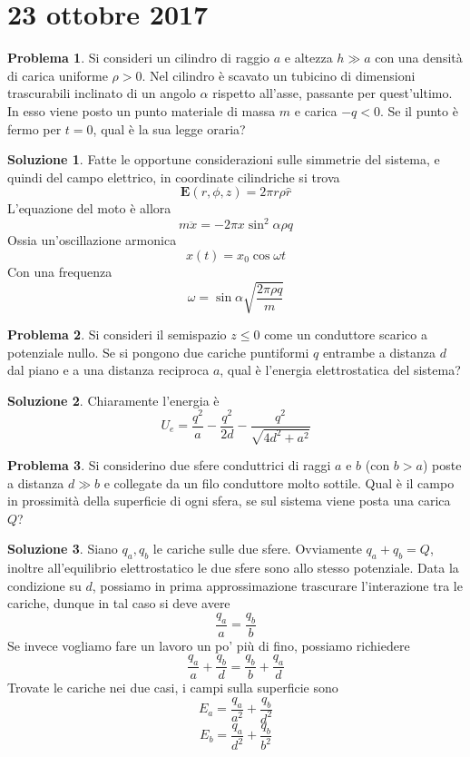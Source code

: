 \documentclass[a4paper,11pt]{book}
\renewcommand{\vec}[1]{\mathbf{#1}}
\theoremstyle{theorem}
\theoremstyle{definition}
\newtheorem{problema}{Problema}[section]
\newtheorem{soluzione}{Soluzione}[section]
\begin{document}
\section{23 ottobre 2017}
\begin{problema}
	Si consideri un cilindro di raggio $a$ e altezza $h\gg a$ con una densità di carica uniforme $\rho>0$. Nel cilindro è scavato un tubicino di dimensioni trascurabili inclinato di un angolo $\alpha$ rispetto all'asse, passante per quest'ultimo. In esso viene posto un punto materiale di massa $m$ e carica $-q<0$. Se il punto è fermo per $t=0$, qual è la sua legge oraria?
\end{problema}
\begin{soluzione}
	Fatte le opportune considerazioni sulle simmetrie del sistema, e quindi del campo elettrico, in coordinate cilindriche si trova
	\[\vec{E}(r,\phi,z)=2\pi r\rho\hat{r}\]
	L'equazione del moto è allora
	\[m\ddot{x}=-2\pi x\sin^2\alpha\rho q\]
	Ossia un'oscillazione armonica
	\[x(t)=x_0\cos\omega t\]
	Con una frequenza
	\[\omega=\sin\alpha\sqrt{\frac{2\pi\rho q}{m}}\] 
\end{soluzione}
\begin{problema}
	Si consideri il semispazio $z\leq0$ come un conduttore scarico a potenziale nullo. Se si pongono due cariche puntiformi $q$ entrambe a distanza $d$ dal piano e a una distanza reciproca $a$, qual è l'energia elettrostatica del sistema?
\end{problema}
\begin{soluzione}
	Chiaramente l'energia è
	\[U_e=\frac{q^2}{a}-\frac{q^2}{2d}-\frac{q^2}{\sqrt{4d^2+a^2}}\]
\end{soluzione}
\begin{problema}
	Si considerino due sfere conduttrici di raggi $a$ e $b$ (con $b>a$) poste a distanza $d\gg b$ e collegate da un filo conduttore molto sottile. Qual è il campo in prossimità della superficie di ogni sfera, se sul sistema viene posta una carica $Q$?
\end{problema}
\begin{soluzione}
	Siano $q_a,q_b$ le cariche sulle due sfere. Ovviamente $q_a+q_b=Q$, inoltre all'equilibrio elettrostatico le due sfere sono allo stesso potenziale. Data la condizione su $d$, possiamo in prima approssimazione trascurare l'interazione tra le cariche, dunque in tal caso si deve avere
	\[\frac{q_a}{a}=\frac{q_b}{b}\]
	Se invece vogliamo fare un lavoro un po' più di fino, possiamo richiedere
	\[\frac{q_a}{a}+\frac{q_b}{d}=\frac{q_b}{b}+\frac{q_a}{d}\]
	Trovate le cariche nei due casi, i campi sulla superficie sono
	\[E_a=\frac{q_a}{a^2}+\frac{q_b}{d^2}\]
	\[E_b=\frac{q_a}{d^2}+\frac{q_b}{b^2}\]
\end{soluzione}
\end{document}
